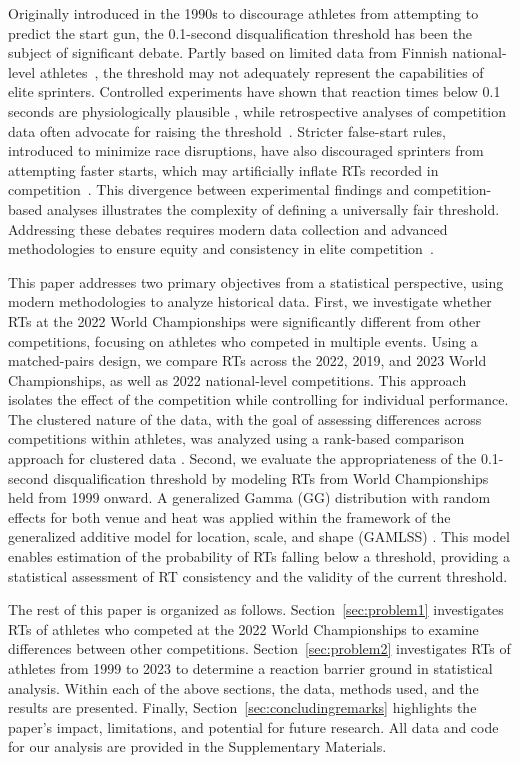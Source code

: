 \documentclass[12pt, letterpaper]{article}
\begin{document}
Originally introduced in the 1990s to discourage athletes from attempting
to predict the start gun, the 0.1-second disqualification threshold 
has been the subject of significant debate.   Partly based on limited
data from Finnish national-level athletes~\citep{mero1990reaction}, the
threshold may not adequately represent the capabilities of elite
sprinters. Controlled experiments have shown that reaction times below
0.1 seconds are physiologically plausible \citep{pain2007sprint,
  komi2009iaaf}, while retrospective analyses of competition data
often advocate for raising the threshold~\citep{brosnan2017effects,
  lipps2011implications}. Stricter false-start rules, introduced to
minimize race disruptions, have also discouraged sprinters from
attempting faster starts, which may artificially inflate RTs recorded
in competition~\citep{haugen2013effect}. This divergence between
experimental findings and competition-based analyses illustrates the
complexity of defining a universally fair threshold. Addressing these
debates requires modern data collection and advanced methodologies to
ensure equity and consistency in elite
competition~\citep{milloz2021sprint}.


This paper addresses two primary objectives from a statistical
perspective, using modern methodologies to analyze historical
data. First, we investigate whether RTs at the 2022
World Championships were significantly different from other
competitions, focusing on athletes who competed in multiple
events. Using a matched-pairs design, we compare RTs across the 2022,
2019, and 2023 World Championships, as well as 2022 national-level
competitions. This approach isolates the effect of the competition
 while controlling for individual performance. The clustered
nature of the data, with the goal of assessing differences across
competitions within athletes, was analyzed using a rank-based comparison
approach for clustered data \citep{datta2005rank}. Second, we evaluate
the appropriateness of the 0.1-second disqualification threshold by
modeling RTs from World Championships held from 1999 onward. A
generalized Gamma (GG) distribution with random effects for both venue and
heat was applied within the framework of the generalized additive
model for location, scale, and shape (GAMLSS)
\citep{rigby2005generalized, stasinopoulos2024generalized}.
This model enables estimation of the
probability of RTs falling below a threshold, providing a
statistical assessment of RT consistency and the validity of the
current threshold.


The rest of this paper is organized as follows. Section~\ref{sec:problem1}
investigates RTs of athletes who competed at the 2022 World Championships to
examine differences between other competitions.  Section~\ref{sec:problem2}
investigates RTs of athletes from 1999 to 2023 to determine a reaction barrier
ground in statistical analysis.  Within each of the above sections, the data,
methods used, and the results are presented.
Finally, Section~\ref{sec:concludingremarks} highlights the
paper’s impact, limitations, and potential for future research.
All data and code for our analysis are provided in the Supplementary
Materials.
\end{document}
